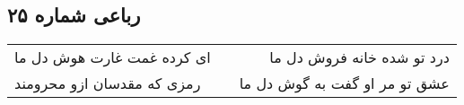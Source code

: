 \begin{center}
\section*{رباعی شماره ۲۵}
\label{sec:sh025}
\begin{longtable}{l p{0.5cm} r}
ای کرده غمت غارت هوش دل ما
&&
درد تو شده خانه فروش دل ما
\\
رمزی که مقدسان ازو محرومند
&&
عشق تو مر او گفت به گوش دل ما
\\
\end{longtable}
\end{center}
